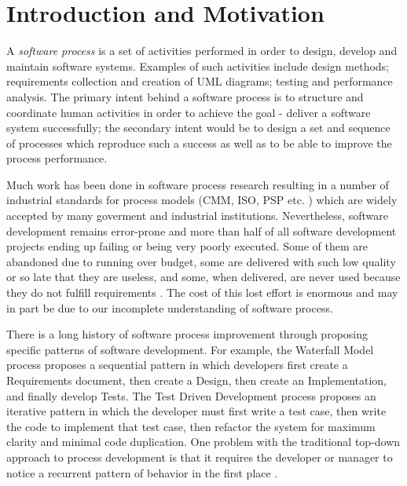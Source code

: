 \documentclass{sig-alternate}
\begin{document}



\section{Introduction and Motivation}
A \textit{software process} is a set of activities performed in order to design, develop and maintain software systems. Examples of such activities include design methods; requirements collection and creation of UML diagrams; testing and performance analysis. The primary intent behind a software process is to structure and coordinate human activities in order to achieve the goal - deliver a software system successfully; the secondary intent would be to design a set and sequence of processes which reproduce such a success as well as to be able to improve the process performance.

Much work has been done in software process research resulting in a number of industrial standards for process models (CMM, ISO, PSP etc. \cite{citeulike:5043104}) which are widely accepted by many goverment and industrial institutions. Nevertheless, software development remains error-prone and more than half of all software development projects ending up failing or being very poorly executed. Some of them are abandoned due to running over budget, some are delivered with such low quality or so late that they are useless, and some, when delivered, are never used because they do not fulfill requirements \cite{citeulike:7351135}. The cost of this lost effort is enormous and may in part be due to our incomplete understanding of software process.

There is a long history of software process improvement through proposing specific patterns of software development. For example, the Waterfall Model process proposes a sequential pattern in which developers first create a Requirements document, then create a Design, then create an Implementation, and finally develop Tests. The Test Driven Development process proposes an iterative pattern in which the developer must first write a test case, then write the code to implement that test case, then refactor the system for maximum clarity and minimal code duplication. One problem with the traditional top-down approach to process development is that it requires the developer or manager to notice a recurrent pattern of behavior in the first place \cite{citeulike:5043104}. 
\end{document}
